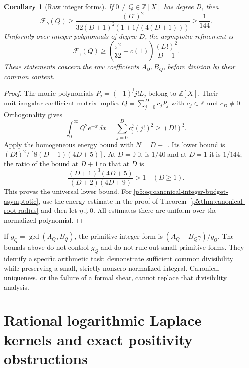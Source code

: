 \documentclass[11pt,a4paper]{article}
\newtheorem{corollary}[theorem]{Corollary}
\theoremstyle{definition}
\theoremstyle{remark}
\numberwithin{equation}{section}
\begin{document}
\begin{corollary}[Raw integer forms]\label{p5:cor:canonical-integer-budget}
If $0\ne Q\in\mathbb Z[X]$ has degree $D$, then
\begin{equation}\label{p5:eq:canonical-integer-budget}
 \mathcal F_\gamma(Q)\geq
 \frac{(D!)^2}{32(D+1)^2(1+1/(4(D+1)))}\geq\frac1{144}.
\end{equation}
Uniformly over integer polynomials of degree $D$, the asymptotic
refinement is
\begin{equation}\label{p5:eq:canonical-integer-budget-asymptotic}
 \mathcal F_\gamma(Q)\geq
       \left(\frac{\pi^2}{32}-o(1)\right)
                \frac{(D!)^2}{D+1}.
\end{equation}
These statements concern the raw coefficients $A_Q,B_Q$, before
division by their common content.
\end{corollary}
\begin{proof}
The monic polynomials $P_j=(-1)^jj!L_j$ belong to $\mathbb Z[X]$.
Their unitriangular coefficient matrix implies
$Q=\sum_{j=0}^Dc_jP_j$ with $c_j\in\mathbb Z$ and $c_D\ne0$.
Orthogonality gives
\[
 \int_0^\infty Q^2e^{-x}\,dx
      =\sum_{j=0}^Dc_j^2(j!)^2\geq(D!)^2.
\]
Apply the homogeneous energy bound with $N=D+1$.
Its lower bound is $(D!)^2/[8(D+1)(4D+5)]$.
At $D=0$ it is $1/40$ and at $D=1$ it is $1/144$;
the ratio of the bound at $D+1$ to that at $D$ is
\[
 \frac{(D+1)^3(4D+5)}{(D+2)(4D+9)}>1\quad(D\geq1).
\]
This proves the universal lower bound.
For \eqref{p5:eq:canonical-integer-budget-asymptotic}, use the energy
estimate in the proof of Theorem~\ref{p5:thm:canonical-root-radius}
and then let $\eta\downarrow0$.  All estimates there are uniform
over the normalized polynomial.
\end{proof}

If $g_Q=\gcd(A_Q,B_Q)$, the primitive integer form is
$(A_Q-B_Q\gamma)/g_Q$.  The bounds above do not control $g_Q$ and
do not rule out small primitive forms.  They identify a specific
arithmetic task: demonstrate sufficient common divisibility while
preserving a small, strictly nonzero normalized integral.
Canonical uniqueness, or the failure of a formal shear, cannot
replace that divisibility analysis.

\section{Rational logarithmic Laplace kernels and exact positivity obstructions}
\label{p5:sec:rational-log-laplace}
\end{document}

